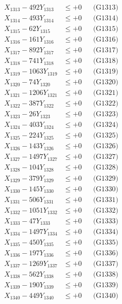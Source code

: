 \documentclass[a4paper,10pt]{article}
\begin{document}
{\begin{align}
X_{1313} - 492Y_{1313} &\leq +0 && \text{(G1313)} \\
X_{1314} - 493Y_{1314} &\leq +0 && \text{(G1314)} \\
X_{1315} - 62Y_{1315} &\leq +0 && \text{(G1315)} \\
X_{1316} - 161Y_{1316} &\leq +0 && \text{(G1316)} \\
X_{1317} - 892Y_{1317} &\leq +0 && \text{(G1317)} \\
X_{1318} - 741Y_{1318} &\leq +0 && \text{(G1318)} \\
X_{1319} - 1063Y_{1319} &\leq +0 && \text{(G1319)} \\
X_{1320} - 74Y_{1320} &\leq +0 && \text{(G1320)} \\
\allowbreak
X_{1321} - 1206Y_{1321} &\leq +0 && \text{(G1321)} \\
X_{1322} - 387Y_{1322} &\leq +0 && \text{(G1322)} \\
X_{1323} - 26Y_{1323} &\leq +0 && \text{(G1323)} \\
X_{1324} - 403Y_{1324} &\leq +0 && \text{(G1324)} \\
X_{1325} - 224Y_{1325} &\leq +0 && \text{(G1325)} \\
X_{1326} - 143Y_{1326} &\leq +0 && \text{(G1326)} \\
X_{1327} - 1497Y_{1327} &\leq +0 && \text{(G1327)} \\
X_{1328} - 104Y_{1328} &\leq +0 && \text{(G1328)} \\
X_{1329} - 379Y_{1329} &\leq +0 && \text{(G1329)} \\
X_{1330} - 145Y_{1330} &\leq +0 && \text{(G1330)} \\
\allowbreak
X_{1331} - 506Y_{1331} &\leq +0 && \text{(G1331)} \\
X_{1332} - 1051Y_{1332} &\leq +0 && \text{(G1332)} \\
X_{1333} - 47Y_{1333} &\leq +0 && \text{(G1333)} \\
X_{1334} - 1497Y_{1334} &\leq +0 && \text{(G1334)} \\
X_{1335} - 450Y_{1335} &\leq +0 && \text{(G1335)} \\
X_{1336} - 197Y_{1336} &\leq +0 && \text{(G1336)} \\
X_{1337} - 1269Y_{1337} &\leq +0 && \text{(G1337)} \\
X_{1338} - 562Y_{1338} &\leq +0 && \text{(G1338)} \\
X_{1339} - 190Y_{1339} &\leq +0 && \text{(G1339)} \\
X_{1340} - 449Y_{1340} &\leq +0 && \text{(G1340)} \\

\end{align}}
\end{document}
